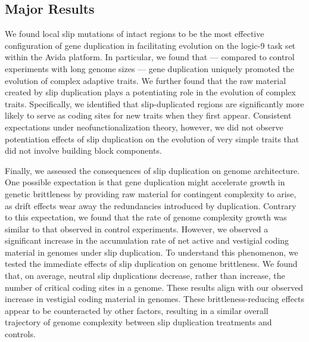 \subsection{Major Results}

We found local slip mutations of intact regions to be the most effective configuration of gene duplication in facilitating evolution on the logic-9 task set within the Avida platform.
In particular, we found that --- compared to control experiments with long genome sizes --- gene duplication uniquely promoted the evolution of complex adaptive traits.
We further found that the raw material created by slip duplication plays a potentiating role in the evolution of complex traits.
Specifically, we identified that slip-duplicated regions are significantly more likely to serve as coding sites for new traits when they first appear.
Consistent expectations under neofunctionalization theory, however, we did not observe potentiation effects of slip duplication on the evolution of very simple traits that did not involve building block components.

Finally, we assessed the consequences of slip duplication on genome architecture.
One possible expectation is that gene duplication might accelerate growth in genetic brittleness by providing raw material for contingent complexity to arise, as drift effects wear away the redundancies introduced by duplication.
Contrary to this expectation, we found that the rate of genome complexity growth was similar to that observed in control experiments.
However, we observed a significant increase in the accumulation rate of net active and vestigial coding material in genomes under slip duplication.
To understand this phenomenon, we tested the immediate effects of slip duplication on genome brittleness.
We found that, on average, neutral slip duplications decrease, rather than increase, the number of critical coding sites in a genome.
These results align with our observed increase in vestigial coding material in genomes.
These brittleness-reducing effects appear to be counteracted by other factors, resulting in a similar overall trajectory of genome complexity between slip duplication treatments and controls.
